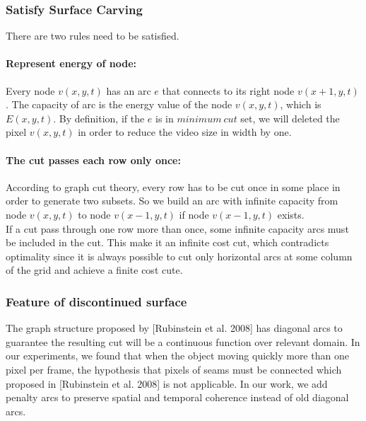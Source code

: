 \documentclass[a4paper, twocolumn]{article}
\begin{document}
			\subsubsection{Satisfy Surface Carving}
			There are two rules need to be satisfied.
			
			\paragraph{Represent energy of node:}
			Every node $v(x,y,t)$ has an arc $e$ that connects to its right node $v(x+1,y,t)$. The capacity of arc is the energy value of the node $v(x,y,t)$, which is $E(x,y,t)$. By definition, if the $e$ is in $minimum \ cut$ set, we will deleted the pixel $v(x,y,t)$ in order to reduce the video size in width by one.
			
			\paragraph{The cut passes each row only once:}
			According to graph cut theory, every row has to be cut once in some place in order to generate two subsets. So we build an arc with infinite capacity from node $v(x,y,t)$ to node $v(x-1,y,t)$ if node $v(x-1,y,t)$ exists.\\
			\linebreak
			If a cut pass through one row more than once, some infinite capacity arcs must be included in the cut. This make it an infinite cost cut, which contradicts optimality since it is always possible to cut only horizontal arcs at some column of the grid and achieve a finite cost cute.\\
			
			\subsubsection{Feature of discontinued surface}
			The graph structure proposed by [Rubinstein et al. 2008] has diagonal arcs to guarantee the resulting cut will be a continuous function over relevant domain. In our experiments, we found that when the object moving quickly more than one pixel per frame, the hypothesis that pixels of seams must be connected which proposed in [Rubinstein et al. 2008] is not applicable. In our work, we add penalty arcs to preserve spatial and temporal coherence instead of old diagonal arcs.
			
\end{document}
